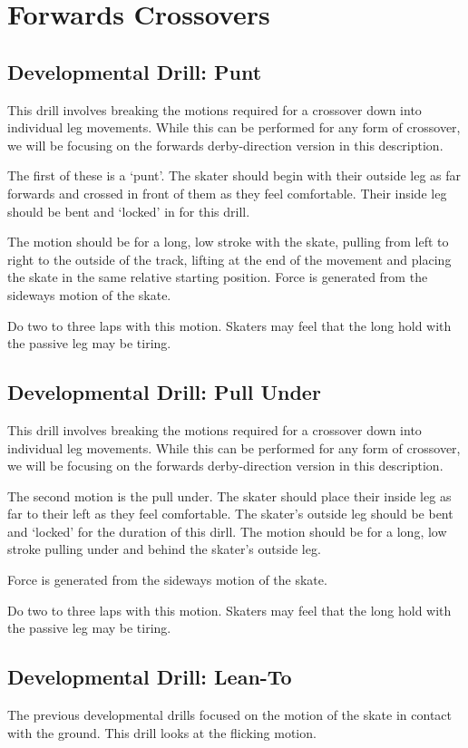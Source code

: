 \section{Forwards Crossovers}
\label{sec:crossovers/forwards}


\subsection*{Developmental Drill: Punt}
This drill involves breaking the motions required for a crossover down into individual leg movements.
While this can be performed for any form of crossover, we will be focusing on the forwards derby-direction version in this description. 


The first of these is a `punt'. The skater should begin with their outside leg as far forwards and crossed in front of them as they feel comfortable. Their inside leg should be bent and `locked' in for this drill. 

The motion should be for a long, low stroke with the skate, pulling from left to right to the outside of the track, lifting at the end of the movement and placing the skate in the same relative starting position. 
Force is generated from the sideways motion of the skate.

Do two to three laps with this motion. 
Skaters may feel that the long hold with the passive leg may be tiring.


\subsection*{Developmental Drill: Pull Under}
This drill involves breaking the motions required for a crossover down into individual leg movements.
While this can be performed for any form of crossover, we will be focusing on the forwards derby-direction version in this description. 

The second motion is the pull under.
The skater should place their inside leg as far to their left as they feel comfortable.
The skater's outside leg should be bent and `locked' for the duration of this dirll.
The motion should be for a long, low stroke pulling under and behind the skater's outside leg.   

Force is generated from the sideways motion of the skate.

Do two to three laps with this motion. 
Skaters may feel that the long hold with the passive leg may be tiring.


\subsection*{Developmental Drill: Lean-To}
The previous developmental drills focused on the motion of the skate in contact with the ground. This drill looks at the flicking motion.     

